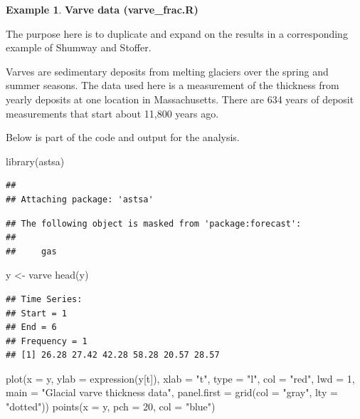 \documentclass[
]{book}
\newenvironment{Shaded}{\begin{snugshade}}{\end{snugshade}}
\newcommand{\AttributeTok}[1]{\textcolor[rgb]{0.77,0.63,0.00}{#1}}
\newcommand{\DecValTok}[1]{\textcolor[rgb]{0.00,0.00,0.81}{#1}}
\newcommand{\FunctionTok}[1]{\textcolor[rgb]{0.00,0.00,0.00}{#1}}
\newcommand{\NormalTok}[1]{#1}
\newcommand{\OtherTok}[1]{\textcolor[rgb]{0.56,0.35,0.01}{#1}}
\newcommand{\StringTok}[1]{\textcolor[rgb]{0.31,0.60,0.02}{#1}}
\theoremstyle{definition}
\theoremstyle{definition}
\newtheorem{example}{Example}[chapter]
\theoremstyle{definition}
\theoremstyle{definition}
\theoremstyle{remark}
\begin{document}
\begin{example}
\textbf{Varve data (varve\_frac.R)}

The purpose here is to duplicate and expand on the results in a corresponding example of Shumway and Stoffer.

Varves are sedimentary deposits from melting glaciers over the spring and summer seasons. The data used here is a measurement of the thickness from yearly deposits at one location in Massachusetts. There are 634 years of deposit measurements that start about 11,800 years ago.

Below is part of the code and output for the analysis.

\begin{Shaded}
\begin{Highlighting}[]
\FunctionTok{library}\NormalTok{(astsa)}
\end{Highlighting}
\end{Shaded}

\begin{verbatim}
## 
## Attaching package: 'astsa'
\end{verbatim}

\begin{verbatim}
## The following object is masked from 'package:forecast':
## 
##     gas
\end{verbatim}

\begin{Shaded}
\begin{Highlighting}[]
\NormalTok{y }\OtherTok{\textless{}{-}}\NormalTok{ varve}
\FunctionTok{head}\NormalTok{(y)}
\end{Highlighting}
\end{Shaded}

\begin{verbatim}
## Time Series:
## Start = 1 
## End = 6 
## Frequency = 1 
## [1] 26.28 27.42 42.28 58.28 20.57 28.57
\end{verbatim}

\begin{Shaded}
\begin{Highlighting}[]
\FunctionTok{plot}\NormalTok{(}\AttributeTok{x =}\NormalTok{ y, }\AttributeTok{ylab =} \FunctionTok{expression}\NormalTok{(y[t]), }\AttributeTok{xlab =} \StringTok{"t"}\NormalTok{, }
    \AttributeTok{type =} \StringTok{"l"}\NormalTok{, }\AttributeTok{col =} \StringTok{"red"}\NormalTok{, }\AttributeTok{lwd =} \DecValTok{1}\NormalTok{, }\AttributeTok{main =} \StringTok{"Glacial }
\StringTok{    varve thickness data"}\NormalTok{, }\AttributeTok{panel.first =} \FunctionTok{grid}\NormalTok{(}\AttributeTok{col =} \StringTok{"gray"}\NormalTok{, }
    \AttributeTok{lty =} \StringTok{"dotted"}\NormalTok{))}
\FunctionTok{points}\NormalTok{(}\AttributeTok{x =}\NormalTok{ y, }\AttributeTok{pch =} \DecValTok{20}\NormalTok{, }\AttributeTok{col =} \StringTok{"blue"}\NormalTok{)}
\end{Highlighting}
\end{Shaded}


\end{example}
\end{document}
